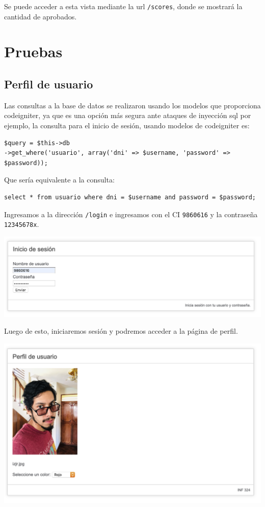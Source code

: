 \documentclass[letter]{article}
\begin{document}
Se puede acceder a esta vista mediante la url \texttt{/scores}, donde se mostrará la
cantidad de aprobados.

\section{Pruebas}
\label{sec:org4f4cd85}
\subsection{Perfil de usuario}
\label{sec:org4f02a9f}
Las consultas a la base de datos se realizaron usando los modelos que
proporciona codeigniter, ya que es una opción más segura ante ataques de
inyección sql por ejemplo, la consulta para el inicio de sesión, usando modelos
de codeigniter es:

\begin{verbatim}
$query = $this->db
->get_where('usuario', array('dni' => $username, 'password' => $password));
\end{verbatim}

Que sería equivalente a la consulta:

\begin{verbatim}
select * from usuario where dni = $username and password = $password;
\end{verbatim}

Ingresamos a la dirección \texttt{/login} e ingresamos con el CI \texttt{9860616} y la
contraseña \texttt{12345678x}.

\begin{center}
\includegraphics[width=.9\linewidth]{./img/login.png}
\end{center}

Luego de esto, iniciaremos sesión y podremos acceder a la página de perfil.

\begin{center}
\includegraphics[width=.9\linewidth]{./img/perfil.png}
\end{center}
\end{document}

